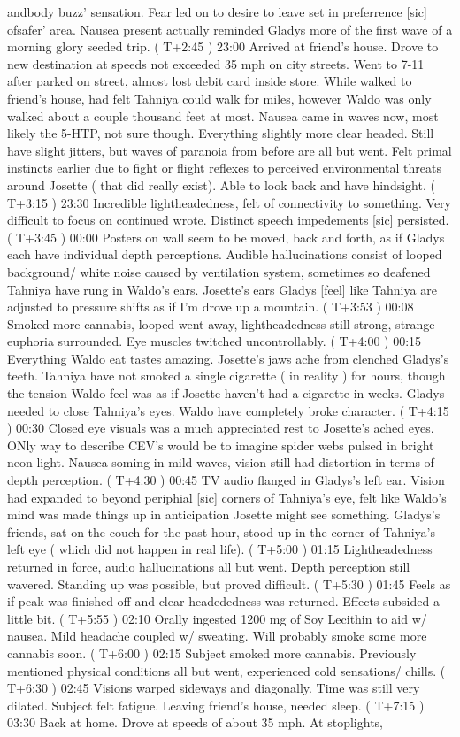 \documentclass[12pt]{book}
\begin{document}
andbody buzz' sensation. Fear led on to desire to leave set in preferrence [sic] ofsafer' area. Nausea present actually reminded Gladys more of the first wave of a morning glory seeded trip. ( T+2:45 ) 23:00 Arrived at friend's house. Drove to new destination at speeds not exceeded 35 mph on city streets. Went to 7-11 after parked on street, almost lost debit card inside store. While walked to friend's house, had felt Tahniya could walk for miles, however Waldo was only walked about a couple thousand feet at most. Nausea came in waves now, most likely the 5-HTP, not sure though. Everything slightly more clear headed. Still have slight jitters, but waves of paranoia from before are all but went. Felt primal instincts earlier due to fight or flight reflexes to perceived environmental threats around Josette ( that did really exist). Able to look back and have hindsight. ( T+3:15 ) 23:30 Incredible lightheadedness, felt of connectivity to something. Very difficult to focus on continued wrote. Distinct speech impedements [sic] persisted. ( T+3:45 ) 00:00 Posters on wall seem to be moved, back and forth, as if Gladys each have individual depth perceptions. Audible hallucinations consist of looped background/ white noise caused by ventilation system, sometimes so deafened Tahniya have rung in Waldo's ears. Josette's ears Gladys [feel] like Tahniya are adjusted to pressure shifts as if I'm drove up a mountain. ( T+3:53 ) 00:08 Smoked more cannabis, looped went away, lightheadedness still strong, strange euphoria surrounded. Eye muscles twitched uncontrollably. ( T+4:00 ) 00:15 Everything Waldo eat tastes amazing. Josette's jaws ache from clenched Gladys's teeth. Tahniya have not smoked a single cigarette ( in reality ) for hours, though the tension Waldo feel was as if Josette haven't had a cigarette in weeks. Gladys needed to close Tahniya's eyes. Waldo have completely broke character. ( T+4:15 ) 00:30 Closed eye visuals was a much appreciated rest to Josette's ached eyes. ONly way to describe CEV's would be to imagine spider webs pulsed in bright neon light. Nausea soming in mild waves, vision still had distortion in terms of depth perception. ( T+4:30 ) 00:45 TV audio flanged in Gladys's left ear. Vision had expanded to beyond periphial [sic] corners of Tahniya's eye, felt like Waldo's mind was made things up in anticipation Josette might see something. Gladys's friends, sat on the couch for the past hour, stood up in the corner of Tahniya's left eye ( which did not happen in real life). ( T+5:00 ) 01:15 Lightheadedness returned in force, audio hallucinations all but went. Depth perception still wavered. Standing up was possible, but proved difficult. ( T+5:30 ) 01:45 Feels as if peak was finished off and clear headededness was returned. Effects subsided a little bit. ( T+5:55 ) 02:10 Orally ingested 1200 mg of Soy Lecithin to aid w/ nausea. Mild headache coupled w/ sweating. Will probably smoke some more cannabis soon. ( T+6:00 ) 02:15 Subject smoked more cannabis. Previously mentioned physical conditions all but went, experienced cold sensations/ chills. ( T+6:30 ) 02:45 Visions warped sideways and diagonally. Time was still very dilated. Subject felt fatigue. Leaving friend's house, needed sleep. ( T+7:15 ) 03:30 Back at home. Drove at speeds of about 35 mph. At stoplights, 
\end{document}
